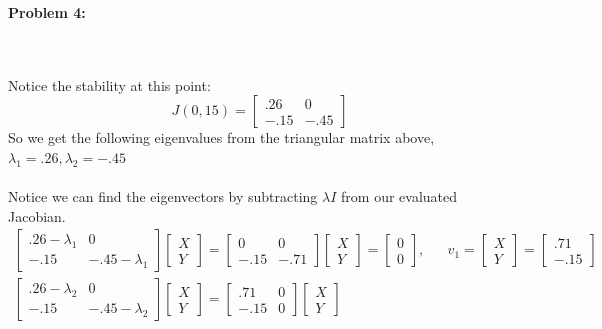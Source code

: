 \documentclass[11pt]{article}
\newenvironment{problem}[1]{\textbf{Problem #1: }}{\newpage}
\begin{document}
\begin{problem}{4}
\begin{enumerate}[label = (\alph*)]
\begin{enumerate}[label = (\roman*)]
				\\ \\
				Notice the stability at this point:
				\[J(0,15) = \begin{bmatrix}
					.26 & 0 \\ -.15 & -.45
				\end{bmatrix}\]
				So we get the following eigenvalues from the triangular matrix above, $\lambda_1 = .26, \lambda_2 = -.45$
				\\ \\
				Notice we can find the eigenvectors by subtracting $\lambda I$ from our evaluated Jacobian.
				\begin{align*}
				\begin{bmatrix}
				.26 - \lambda_1 & 0 \\ -.15 & -.45 -\lambda_1 
				\end{bmatrix}\begin{bmatrix}
				X \\ Y
				\end{bmatrix} = 
				\begin{bmatrix}
				0 & 0 \\ -.15 & -.71
				\end{bmatrix}\begin{bmatrix}
				X \\ Y
				\end{bmatrix} = 
				\begin{bmatrix}
				0 \\ 0
				\end{bmatrix}, && v_1 = \begin{bmatrix}
				X \\ Y
				\end{bmatrix} = 
				\begin{bmatrix}
				.71 \\ -.15 
				\end{bmatrix}
				\\ 
				\begin{bmatrix}
				.26 - \lambda_2 & 0 \\ -.15 & -.45 -\lambda_2
				\end{bmatrix}\begin{bmatrix}
				X \\ Y
				\end{bmatrix} = 
				\begin{bmatrix}
				.71 & 0 \\ -.15 & 0
				\end{bmatrix}\begin{bmatrix}
				X \\ Y

\end{bmatrix}
\end{align*}
\end{enumerate}
\end{enumerate}
\end{problem}
\end{document}
